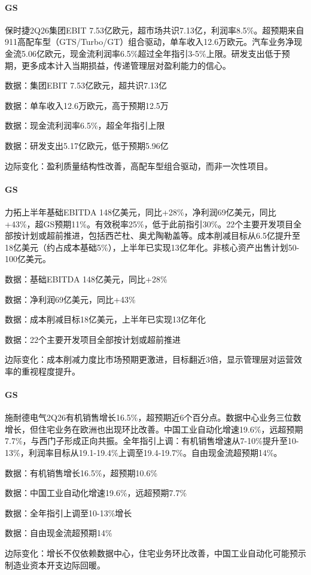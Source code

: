 \documentclass[11pt]{ctexart}
\begin{document}
\paragraph{GS} 保时捷2Q26集团EBIT 7.53亿欧元，超市场共识7.13亿，利润率8.5\%。超预期来自911高配车型（GTS/Turbo/GT）组合驱动，单车收入12.6万欧元。汽车业务净现金流5.06亿欧元，现金流利润率6.5\%超过全年指引3-5\%上限。研发支出低于预期，更多成本计入当期损益，传递管理层对盈利能力的信心。
{\small\color{refgray}数据：集团EBIT 7.53亿欧元，超共识7.13亿\par}
{\small\color{refgray}数据：单车收入12.6万欧元，高于预期12.5万\par}
{\small\color{refgray}数据：现金流利润率6.5\%，超全年指引上限\par}
{\small\color{refgray}数据：研发支出5.17亿欧元，低于预期5.96亿\par}
{\small\color{refgray}边际变化：盈利质量结构性改善，高配车型组合驱动，而非一次性项目。\par}
\paragraph{GS} 力拓上半年基础EBITDA 148亿美元，同比+28\%，净利润69亿美元，同比+43\%，超GS预期11\%。有效税率25\%，低于此前指引30\%。22个主要开发项目全部按计划或超前推进，包括西芒杜、奥尤陶勒盖等。成本削减目标从6.5亿提升至18亿美元（约占成本基础5\%），上半年已实现13亿年化。非核心资产出售计划50-100亿美元。
{\small\color{refgray}数据：基础EBITDA 148亿美元，同比+28\%\par}
{\small\color{refgray}数据：净利润69亿美元，同比+43\%\par}
{\small\color{refgray}数据：成本削减目标18亿美元，上半年已实现13亿年化\par}
{\small\color{refgray}数据：22个主要开发项目全部按计划或超前推进\par}
{\small\color{refgray}边际变化：成本削减力度比市场预期更激进，目标翻近3倍，显示管理层对运营效率的重视程度提升。\par}
\paragraph{GS} 施耐德电气2Q26有机销售增长16.5\%，超预期近6个百分点。数据中心业务三位数增长，但住宅业务在欧洲也出现环比改善。中国工业自动化增速19.6\%，远超预期7.7\%，与西门子形成正向共振。全年指引上调：有机销售增速从7-10\%提升至10-13\%，利润率目标从19.1-19.4\%上调至19.4-19.7\%。自由现金流超预期14\%。
{\small\color{refgray}数据：有机销售增长16.5\%，超预期10.6\%\par}
{\small\color{refgray}数据：中国工业自动化增速19.6\%，远超预期7.7\%\par}
{\small\color{refgray}数据：全年指引上调至10-13\%增长\par}
{\small\color{refgray}数据：自由现金流超预期14\%\par}
{\small\color{refgray}边际变化：增长不仅依赖数据中心，住宅业务环比改善，中国工业自动化可能预示制造业资本开支边际回暖。\par}
\end{document}
